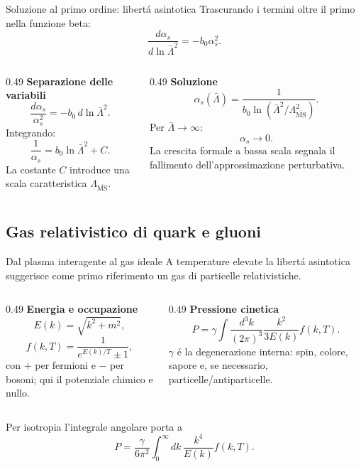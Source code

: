 \begin{frame}{Soluzione al primo ordine: libert\'a asintotica}
\small
Trascurando i termini oltre il primo nella funzione beta:
\[
\frac{d\alpha_s}{d\ln\bar\Lambda^2}=-b_0\alpha_s^2.
\]
\begin{columns}[T,onlytextwidth]
\begin{column}{0.49\textwidth}
\textbf{Separazione delle variabili}
\[
\frac{d\alpha_s}{\alpha_s^2}
=-b_0\,d\ln\bar\Lambda^2.
\]
Integrando:
\[
\frac1{\alpha_s}=b_0\ln\bar\Lambda^2+C.
\]
La costante $C$ introduce una scala
caratteristica $\Lambda_{\overline{\mathrm{MS}}}$.
\end{column}
\begin{column}{0.49\textwidth}
\textbf{Soluzione}
\[
\alpha_s(\bar\Lambda)=
\frac1{b_0\ln(\bar\Lambda^2/
\Lambda_{\overline{\mathrm{MS}}}^2)}.
\]
Per $\bar\Lambda\to\infty$:
\[
\alpha_s\to0.
\]
La crescita formale a bassa scala segnala
il fallimento dell'approssimazione perturbativa.
\end{column}
\end{columns}
\end{frame}

\subsection{Gas relativistico di quark e gluoni}

\begin{frame}{Dal plasma interagente al gas ideale}
\small
A temperature elevate la libert\'a asintotica suggerisce
come primo riferimento un gas di particelle relativistiche.
\begin{columns}[T,onlytextwidth]
\begin{column}{0.49\textwidth}
\textbf{Energia e occupazione}
\[
E(k)=\sqrt{k^2+m^2},
\]
\[
f(k,T)=\frac1{e^{E(k)/T}\pm1},
\]
con $+$ per fermioni e $-$ per bosoni;
qui il potenziale chimico e nullo.
\end{column}
\begin{column}{0.49\textwidth}
\textbf{Pressione cinetica}
\[
P=\gamma\int\frac{d^3k}{(2\pi)^3}
\frac{k^2}{3E(k)}f(k,T).
\]
$\gamma$ \'e la degenerazione interna:
spin, colore, sapore e, se necessario,
particelle/antiparticelle.
\end{column}
\end{columns}
\medskip
Per isotropia l'integrale angolare porta a
\[
P=\frac{\gamma}{6\pi^2}\int_0^\infty dk\,
\frac{k^4}{E(k)}f(k,T).
\]
\end{frame}

